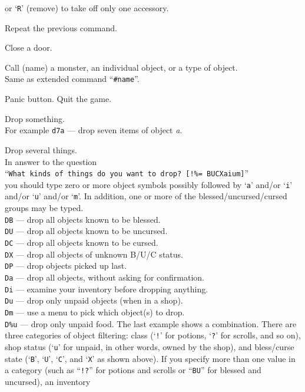 or `{\tt R}' (remove) to take off only one accessory.
\item[\tb{\^{}A}]
Repeat the previous command.
\item[\tb{c}]
Close a door.
\item[\tb{C}]
Call (name) a monster, an individual object, or a type of object.\\
Same as extended command ``{\tt \#name}''.
\item[\tb{\^{}C}]
Panic button.  Quit the game.
\item[\tb{d}]
Drop something.\\
For example {\tt d7a} --- drop seven items of object
{\it a}.
\item[\tb{D}]
Drop several things.\\
In answer to the question\\
``{\tt What kinds of things do you want to drop? [!\%= BUCXaium]}''\\
you should type zero or more object symbols possibly followed by
`{\tt a}' and/or `{\tt i}' and/or `{\tt u}' and/or `{\tt m}'.
In addition, one or more of
the bless\-ed/\-un\-curs\-ed/\-curs\-ed groups may be typed.\\
{\tt DB}  --- drop all objects known to be blessed.\\
{\tt DU}  --- drop all objects known to be uncursed.\\
{\tt DC}  --- drop all objects known to be cursed.\\
{\tt DX}  --- drop all objects of unknown B/U/C status.\\
{\tt DP}  --- drop objects picked up last.\\
{\tt Da}  --- drop all objects, without asking for confirmation.\\
{\tt Di}  --- examine your inventory before dropping anything.\\
{\tt Du}  --- drop only unpaid objects (when in a shop).\\
{\tt Dm}  --- use a menu to pick which object(s) to drop.\\
{\tt D\%u} --- drop only unpaid food.
The last example shows a combination.
There are three categories of object filtering: class (`{\tt !}' for
potions, `{\tt ?}' for scrolls, and so on), shop status (`{\tt u}' for
unpaid, in other words, owned by the shop), and bless/curse state
(`{\tt B}', `{\tt U}', `{\tt C}', and `{\tt X}' as shown above).
If you specify more than one value in a category (such as ``{\tt !?}'' for
potions and scrolls or ``{\tt BU}'' for blessed and uncursed), an inventory

